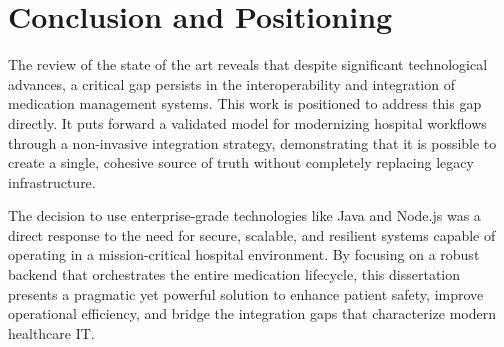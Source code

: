 \section{Conclusion and Positioning}

The review of the state of the art reveals that despite significant technological advances, a critical gap persists in the interoperability and integration of medication management systems. This work is positioned to address this gap directly. It puts forward a validated model for modernizing hospital workflows through a non-invasive integration strategy, demonstrating that it is possible to create a single, cohesive source of truth without completely replacing legacy infrastructure.

The decision to use enterprise-grade technologies like Java and Node.js was a direct response to the need for secure, scalable, and resilient systems capable of operating in a mission-critical hospital environment. By focusing on a robust backend that orchestrates the entire medication lifecycle, this dissertation presents a pragmatic yet powerful solution to enhance patient safety, improve operational efficiency, and bridge the integration gaps that characterize modern healthcare IT. 